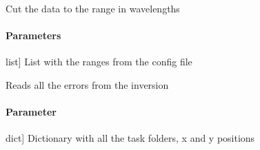 \documentclass[letterpaper,10pt,english]{sphinxmanual}
\begin{document}
\begin{fulllineitems}

\begin{fulllineitems}
\label{\detokenize{classes:profile_stk.Profile.cut_to_wave}}
\pysigstartsignatures
{}
\pysigstopsignatures
\sphinxAtStartPar
Cut the data to the range in wavelengths


\paragraph{Parameters}
\label{\detokenize{classes:id38}}\begin{description}
\sphinxlineitem{range\_wave}{[}list{]}
\sphinxAtStartPar
List with the ranges from the config file

\end{description}

\end{fulllineitems}


\begin{fulllineitems}
\label{\detokenize{classes:profile_stk.Profile.read}}
\pysigstartsignatures
{}
\pysigstopsignatures
\end{fulllineitems}


\begin{fulllineitems}
\label{\detokenize{classes:profile_stk.Profile.read_results}}
\pysigstartsignatures
{}
\pysigstopsignatures
\sphinxAtStartPar
Reads all the errors from the inversion


\paragraph{Parameter}
\label{\detokenize{classes:id39}}\begin{description}
\sphinxlineitem{task}{[}dict{]}
\sphinxAtStartPar
Dictionary with all the task folders, x and y positions


\end{description}
\end{fulllineitems}
\end{fulllineitems}
\end{document}

